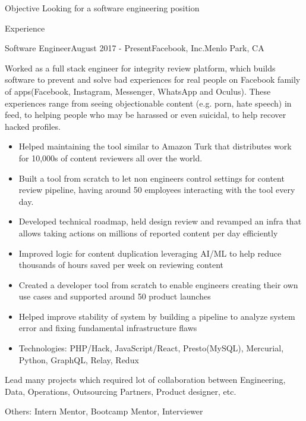 \documentclass{resume} %
\begin{document}
\center

\begin{rSection}{Objective}
Looking for a software engineering position
\end{rSection}


\begin{rSection}{Experience}
\begin{rSubsection}{Software Engineer}{August 2017 - Present}{Facebook, Inc.}{Menlo Park, CA}
\item Worked as a full stack engineer for integrity review platform, which builds software to prevent and solve bad experiences for real people on Facebook family of apps(Facebook, Instagram, Messenger, WhatsApp and Oculus). These experiences range from seeing objectionable content (e.g. porn, hate speech) in feed, to helping people who may be harassed or even suicidal, to help recover hacked profiles.
\begin{itemize}
\item Helped maintaining the tool similar to Amazon Turk that distributes work for 10,000s of content reviewers all over the world.
\item Built a tool from scratch to let non engineers control settings for content review pipeline, having around 50 employees interacting with the tool every day.
\item Developed technical roadmap, held design review and revamped an infra that allows taking actions on millions of reported content per day efficiently
\item Improved logic for content duplication leveraging AI/ML to help reduce thousands of hours saved per week on reviewing content
\item Created a developer tool from scratch to enable engineers creating their own use cases and supported around 50 product launches
\item Helped improve stability of system by building a pipeline to analyze system error and fixing fundamental infrastructure flaws
\item Technologies: PHP/Hack, JavaScript/React, Presto(MySQL), Mercurial, Python, GraphQL, Relay, Redux
\end{itemize}
\item Lead many projects which required lot of collaboration between Engineering, Data, Operations, Outsourcing Partners, Product designer, etc.
\item Others: Intern Mentor, Bootcamp Mentor, Interviewer


\end{rSubsection}
\end{rSection}
\end{document}
